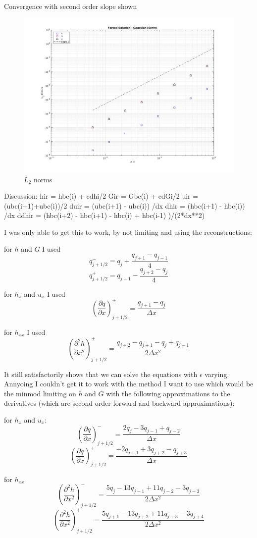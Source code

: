 \documentclass[10pt]{article}
\begin{document}
	
	Convergence with second order slope shown
	
	\begin{figure}[h!]
		\includegraphics[width=23.0cm]{NormResults.jpg}
		\caption{$L_2$ norms }
	\end{figure}

	Discussion:
	         hir = hbc(i) + cdhi/2
	Gir = Gbc(i) + cdGi/2
	uir = (ubc(i+1)+ubc(i))/2
	duir = (ubc(i+1) - ubc(i)) /dx
	dhir = (hbc(i+1) - hbc(i)) /dx
	ddhir = (hbc(i+2)  - hbc(i+1) - hbc(i) + hbc(i-1) )/(2*dx**2)
	
	I was only able to get this to work, by not limiting and using the reconstructions:
	
	for $h$ and $G$ I used
	\[q^-_{j+1/2} = q_j + \frac{q_{j+1} - q_{j-1}}{4} \]
	\[q^+_{j+1/2} = q_{j+1} - \frac{q_{j+2} - q_{j}}{4} \]
	
	for $h_x$ and $u_x$ I used
	\[\left(\frac{\partial q}{\partial x}\right)^\pm_{j+1/2} = \frac{q_{j+1} - q_j}{\Delta x}\]
	
	for $h_{xx}$ I used
\[\left(\frac{\partial^2 h}{\partial x^2}\right)^\pm_{j+1/2} = \frac{q_{j+2} - q_{j+1} - q_{j} +   q_{j-1}}{2 \Delta x^2}\]	

	It still satisfactorily shows that we can solve the equations with $\epsilon$ varying. Annyoing I couldn't get it to work with the method I want to use which would be the minmod limiting on $h$ and $G$ with the following approximations to the derivatives (which are second-order forward and backward approximations):
	
	for $h_x$ and $u_x$:
	\[\left(\frac{\partial q}{\partial x}\right)^-_{j+1/2} = \frac{2q_{j} - 3q_{j-1} + q_{j-2}}{\Delta x} \]
	\[\left(\frac{\partial q}{\partial x}\right)^+_{j+1/2} = \frac{-2q_{j+1} + 3q_{j+2} - q_{j+3}}{\Delta x} \]
	
	for $h_{xx}$
	\[\left(\frac{\partial^2 h}{\partial x^2}\right)^-_{j+1/2} = \frac{5q_j -13 q_{j-1} + 11 q_{j-2} - 3 q_{j-3}}{2 \Delta x^2}\]
	\[\left(\frac{\partial^2 h}{\partial x^2}\right)^+_{j+1/2} = \frac{5q_{j+1} -13 q_{j+2} + 11 q_{j+3} - 3 q_{j+4}}{2 \Delta x^2}\]		
	
  
\end{document}
